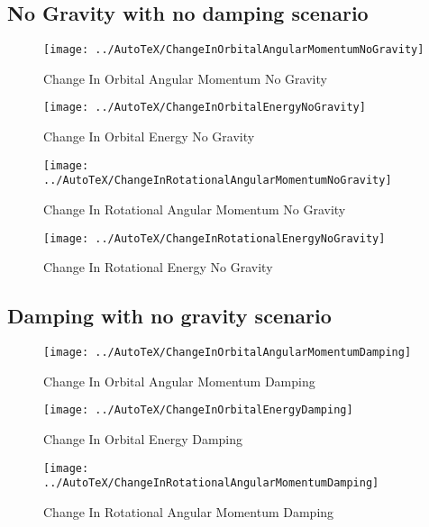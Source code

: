 \subsection{No Gravity with no damping scenario}
\begin{figure}[htbp]
	\centerline{
		\texttt{[image: ../AutoTeX/ChangeInOrbitalAngularMomentumNoGravity]}}
	\caption{Change In Orbital Angular Momentum No Gravity}
	\label{fig:ChangeInOrbitalAngularMomentumNoGravity}
\end{figure}
\begin{figure}[htbp]
	\centerline{
		\texttt{[image: ../AutoTeX/ChangeInOrbitalEnergyNoGravity]}}
	\caption{Change In Orbital Energy No Gravity}
	\label{fig:ChangeInOrbitalEnergyNoGravity}
\end{figure}
\begin{figure}[htbp]
	\centerline{
		\texttt{[image: ../AutoTeX/ChangeInRotationalAngularMomentumNoGravity]}}
	\caption{Change In Rotational Angular Momentum No Gravity}
	\label{fig:ChangeInRotationalAngularMomentumNoGravity}
\end{figure}
\begin{figure}[htbp]
	\centerline{
		\texttt{[image: ../AutoTeX/ChangeInRotationalEnergyNoGravity]}}
	\caption{Change In Rotational Energy No Gravity}
	\label{fig:ChangeInRotationalEnergyNoGravity}
\end{figure}

\clearpage

\subsection{Damping with no gravity scenario}
\begin{figure}[htbp]
	\centerline{
		\texttt{[image: ../AutoTeX/ChangeInOrbitalAngularMomentumDamping]}}
	\caption{Change In Orbital Angular Momentum Damping}
	\label{fig:ChangeInOrbitalAngularMomentumNoGravityDamping}
\end{figure}
\begin{figure}[htbp]
	\centerline{
		\texttt{[image: ../AutoTeX/ChangeInOrbitalEnergyDamping]}}
	\caption{Change In Orbital Energy Damping}
	\label{fig:ChangeInOrbitalEnergyDamping}
\end{figure}
\begin{figure}[htbp]
	\centerline{
		\texttt{[image: ../AutoTeX/ChangeInRotationalAngularMomentumDamping]}}
	\caption{Change In Rotational Angular Momentum Damping}
	\label{fig:ChangeInRotationalAngularMomentumDamping}
\end{figure}
\clearpage
